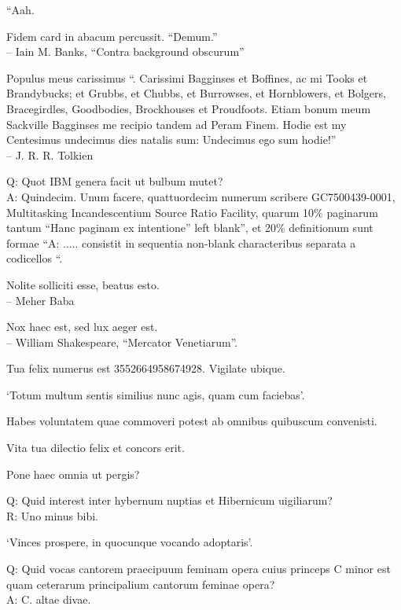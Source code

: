 \documentclass[titlepage,12pt]{memoir}
\begin{document}
“Aah.

Fidem card in abacum percussit. “Demum.”
\\-- Iain M. Banks, “Contra background obscurum”

 Populus meus carissimus “.
Carissimi Bagginses et Boffines, ac mi Tooks et Brandybucks;
et Grubbs, et Chubbs, et Burrowses, et Hornblowers, et Bolgers,
Bracegirdles, Goodbodies, Brockhouses et Proudfoots. Etiam bonum meum
Sackville Bagginses me recipio tandem ad Peram Finem. Hodie est my
Centesimus undecimus dies natalis sum: Undecimus ego sum hodie!”
\\-- J. R. R. Tolkien

Q: Quot IBM genera facit ut bulbum mutet?\\
A: Quindecim. Unum facere, quattuordecim numerum scribere
GC7500439-0001, Multitasking Incandescentium Source Ratio Facility,
quarum 10\% paginarum tantum “Hanc paginam ex intentione”
left blank”, et 20\% definitionum sunt formae “A: .....
consistit in sequentia non-blank characteribus separata a codicellos “.

Nolite solliciti esse, beatus esto.
\\-- Meher Baba

Nox haec est, sed lux aeger est.
\\-- William Shakespeare, “Mercator Venetiarum”.

Tua felix numerus est 3552664958674928. Vigilate ubique.

‘Totum multum sentis similius nunc agis, quam cum faciebas’.

Habes voluntatem quae commoveri potest ab omnibus quibuscum convenisti.

Vita tua dilectio felix et concors erit.

Pone haec omnia ut pergis?

Q: Quid interest inter hybernum nuptias et Hibernicum uigiliarum?\\
R: Uno minus bibi.

‘Vinces prospere, in quocunque vocando adoptaris’.

Q: Quid vocas cantorem praecipuum feminam opera cuius princeps C
minor est quam ceterarum principalium cantorum feminae opera?\\
A: C. altae divae.
\end{document}
